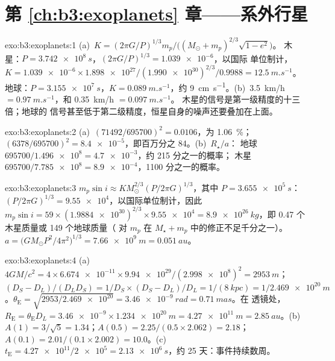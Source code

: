 \section*{第 \ref{ch:b3:exoplanets} 章——系外行星}

\begin{solution}{exo:b3:exoplanets:1}
(a)~$K = (2\pi G/P)^{1/3}m_p/\bigl((M_\odot + m_p)^{2/3}\sqrt{1 - e^2}\bigr)$。
木星：$P = \qty{3.742e8}{s}$，$(2\pi G/P)^{1/3} = \num{1.039e-6}$，以国际
单位制计，$K = \num{1.039e-6}\times\num{1.898e27}/(\num{1.990e30})^{2/3}/0.9988
= \qty{12.5}{m.s^{-1}}$。地球：$P = \qty{3.155e7}{s}$，$K =
\qty{0.089}{m.s^{-1}}$，约 \qty{9}{cm.s^{-1}}。(b)~\qty{3.5}{km/h} $=
\qty{0.97}{m.s^{-1}}$，和 \qty{0.35}{km/h} $= \qty{0.097}{m.s^{-1}}$。
木星的信号是第一级精度的十三倍；地球的
信号甚至低于第二级精度，恒星自身的噪声还要叠加在上面。
\end{solution}

\begin{solution}{exo:b3:exoplanets:2}
(a)~$(71492/695700)^2 = \num{0.0106}$，为 \qty{1.06}{\percent}；
$(6378/695700)^2 = \num{8.4e-5}$，即百万分之 84。(b)~$R_\star/a$：
地球 $695700/\num{1.496e8} = \num{4.7e-3}$，约 215 分之一的概率；
木星 $695700/\num{7.785e8} = \num{8.9e-4}$，1100 分之一的概率。
\end{solution}

\begin{solution}{exo:b3:exoplanets:3}
$m_p\sin i \approx K M_\odot^{2/3}(P/2\pi G)^{1/3}$，其中 $P =
\qty{3.655e5}{s}$：$(P/2\pi G)^{1/3} = \num{9.55e4}$，以国际单位制计，因此 $m_p
\sin i = 59\times(\num{1.9884e30})^{2/3}\times\num{9.55e4} =
\qty{8.9e26}{kg}$，即 0.47 个木星质量或 149 个地球质量（
对 $m_p$ 在 $M_\star + m_p$ 中的修正不足千分之一）。
$a = \bigl(GM_\odot P^2/4\pi^2\bigr)^{1/3} = \qty{7.66e9}{m} =
\qty{0.051}{au}$。
\end{solution}

\begin{solution}{exo:b3:exoplanets:4}
(a)~$4GM/c^2 = 4\times\num{6.674e-11}\times\num{9.94e29}/(\num{2.998e8})^2 =
\qty{2953}{m}$；$(D_S - D_L)/(D_LD_S) = 1/D_S\times(D_S - D_L)/D_L =
1/(\qty{8}{kpc}) = 1/\qty{2.469e20}{m}$。$\theta_\mathrm E =
\sqrt{2953/\num{2.469e20}} = \qty{3.46e-9}{rad} = \qty{0.71}{mas}$。在
透镜处，$R_\mathrm E = \theta_\mathrm E D_L = \num{3.46e-9}\times
\qty{1.234e20}{m} = \qty{4.27e11}{m} = \qty{2.85}{au}$。(b)~$A(1) =
3/\sqrt5 = 1.34$；$A(0.5) = 2.25/(0.5\times2.062) = 2.18$；$A(0.1) =
2.01/(0.1\times2.002) = 10.0$。(c)~$t_\mathrm E = \num{4.27e11}/\num{2e5}
= \qty{2.13e6}{s}$，约 25 天：事件持续数周。
\end{solution}

